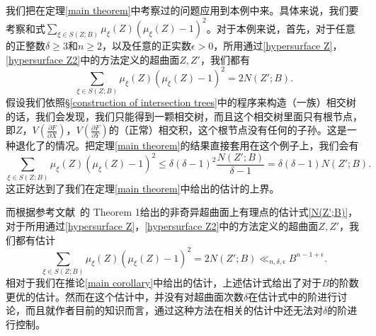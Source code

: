 \begin{example}
我们把在定理\ref{main theorem}中考察过的问题应用到本例中来。具体来说，我们要考察和式$\sum\limits_{\xi \in S(Z;B)} \mu_{\xi}(Z)(\mu_{\xi}(Z)-1)^2$。对于本例来说，首先，对于任意的正整数$\delta \geqslant 3$和$n \geqslant 2$，以及任意的正实数$\epsilon > 0$，所用通过\eqref{hypersurface Z}，\eqref{hypersurface Z2}中的方法定义的超曲面$Z,Z'$，我们都有
\begin{equation}
\sum_{\xi \in S(Z;B)} \mu_{\xi}(Z)(\mu_{\xi}(Z)-1)^2 = 2N(Z';B).
\end{equation}
假设我们依照\S\ref{construction of intersection trees}中的程序来构造（一族）相交树的话，我们会发现，我们只能得到一颗相交树，而且这个相交树里面只有根节点，即$Z$，$V \left(\frac{\partial F}{\partial X}\right)$，$V \left(\frac{\partial F}{\partial Y}\right)$的（正常）相交积，这个根节点没有任何的子孙。这是一种退化了的情况。把定理\ref{main theorem}的结果直接套用在这个例子上，我们会有
\begin{equation}
\sum_{\xi \in S(Z;B)} \mu_{\xi}(Z)(\mu_{\xi}(Z)-1)^2 \leqslant \delta(\delta-1)^2 \frac{N(Z';B)}{\delta-1} = \delta(\delta-1)N(Z';B).
\end{equation}
这正好达到了我们在定理\ref{main theorem}中给出的估计的上界。


而根据参考文献~的 Theorem 1给出的非奇异超曲面上有理点的估计式\eqref{N(Z';B)}，对于所用通过\eqref{hypersurface Z}，\eqref{hypersurface Z2}中的方法定义的超曲面$Z, Z'$，我们都有估计
\begin{equation}
\sum_{\xi \in S(Z;B)} \mu_{\xi}(Z)(\mu_{\xi}(Z)-1)^2 = 2N(Z';B) \ll_{n,\delta,\epsilon} B^{n-1+\epsilon}.
\end{equation}
相对于我们在推论\ref{main corollary}中给出的估计，上述估计式给出了对于$B$的阶数更优的估计。然而在这个估计中，并没有对超曲面次数$\delta$在估计式中的阶进行讨论，而且就作者目前的知识而言，通过这种方法在相关的估计中还无法对$\delta$的阶进行控制。

\end{example}

